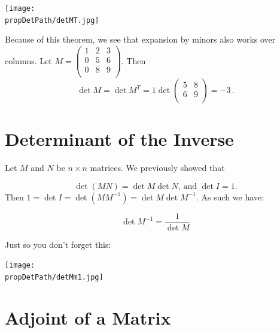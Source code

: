 \begin{center}
\texttt{[image: \\propDetPath/detMT.jpg]}
\end{center}

\begin{example}
Because of this theorem, we see that expansion by minors also works over columns.  Let $M=\begin{pmatrix}
1 & 2 & 3 \\
0 & 5 & 6 \\
0 & 8 & 9 \\
\end{pmatrix}$.  Then \[\det M = \det M^T = 1\det \begin{pmatrix}
5 & 8 \\
6 & 9 \\
\end{pmatrix}=-3\, .\]
\end{example}

\section{Determinant of the Inverse}

Let $M$ and $N$ be $n\times n$ matrices.
We previously showed that 

\[
\det (MN)=\det M \det N \text{, and } \det I=1.
\]
Then $1 = \det I = \det (MM^{-1}) = \det M \det M^{-1}$.  As such we have:
\begin{theorem}
\[
\det M^{-1} = \frac{1}{\det M}
\]
\end{theorem}

Just so you don't forget this:
\begin{center}
\texttt{[image: \\propDetPath/detMm1.jpg]}
\end{center}


\section{Adjoint of a Matrix}



